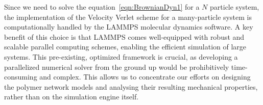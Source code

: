 Since we need to solve the equation~\eqref{eqn:BrownianDyn1} for a $N$ particle system, the implementation of the Velocity Verlet scheme for a many-particle system is computationally handled by the LAMMPS molecular dynamics software.
A key benefit of this choice is that LAMMPS comes well-equipped with robust and scalable parallel computing schemes, enabling the efficient simulation of large systems. 
This pre-existing, optimized framework is crucial, as developing a parallelized numerical solver from the ground up would be prohibitively time-consuming and complex. 
This allows us to concentrate our efforts on designing the polymer network models and analysing their resulting mechanical properties, rather than on the simulation engine itself.

